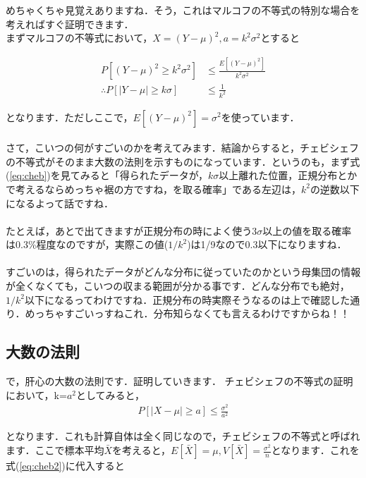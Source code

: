 \documentclass[11pt,a4paper,uplatex]{ujreport} 	%
\begin{document}
めちゃくちゃ見覚えありますね．そう，これはマルコフの不等式の特別な場合を考えればすぐ証明できます．\\

まずマルコフの不等式において，$X=(Y-\mu)^2, a = k^2\sigma^2$とすると

\begin{align}
  P[(Y-\mu)^2 \geq k^2\sigma^2] &\leq \frac{E[(Y-\mu)^2]}{k^2\sigma^2}\\
  \therefore P[|Y-\mu| \geq k\sigma] &\leq \frac{1}{k^2}
\end{align}

となります．ただしここで，$E[(Y-\mu)^2]=\sigma^2$を使っています．\\\\

さて，こいつの何がすごいのかを考えてみます．結論からすると，チェビシェフの不等式がそのまま大数の法則を示すものになっています．というのも，まず式(\ref{eq:cheb})を見てみると「得られたデータが，$k\sigma$以上離れた位置，正規分布とかで考えるならめっちゃ裾の方ですね，を取る確率」である左辺は，$k^2$の逆数以下になるよって話ですね．\\
\\

たとえば，あとで出てきますが正規分布の時によく使う$3\sigma$以上の値を取る確率は0.3\%程度なのですが，実際この値($1/k^2$)は1/9なので0.3以下になりますね．\\
\\

すごいのは，得られたデータがどんな分布に従っていたのかという母集団の情報が全くなくても，こいつの収まる範囲が分かる事です．どんな分布でも絶対，$1/k^2$以下になるってわけですね．正規分布の時実際そうなるのは上で確認した通り．めっちゃすごいっすねこれ．分布知らなくても言えるわけですからね！！

\subsection{大数の法則}
で，肝心の大数の法則です．証明していきます．
チェビシェフの不等式の証明において，k=$a^2$としてみると，
\begin{align}
  P[|X-\mu| \geq a] \leq \frac{\sigma^2}{a^2}
  \label{eq:cheb2}
\end{align}

となります．これも計算自体は全く同じなので，チェビシェフの不等式と呼ばれます．ここで標本平均$\bar{X}$を考えると，$E[\bar{X}] = \mu, V[\bar{X}] = \frac{\sigma^2}{n}$となります．これを式(\ref{eq:cheb2})に代入すると
\end{document}
